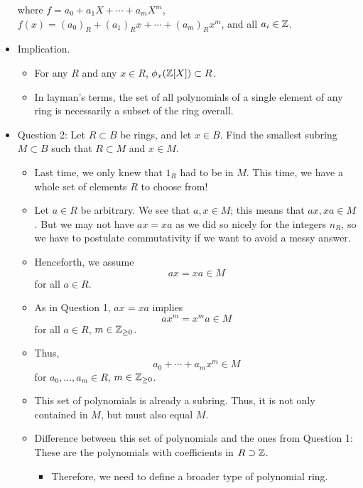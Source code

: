 \documentclass[../notes.tex]{subfiles}
\begin{document}
\begin{itemize}
    where $f=a_0+a_1X+\cdots+a_mX^m$, $f(x)=(a_0)_R+(a_1)_Rx+\cdots+(a_m)_Rx^m$, and all $a_i\in\mathbb{Z}$.
    \item Implication.
    \begin{itemize}
        \item For any $R$ and any $x\in R$, $\phi_x(\mathbb{Z}[X])\subset R$.
        \item In layman's terms, the set of all polynomials of a single element of any ring is necessarily a subset of the ring overall.
    \end{itemize}
    \item Question 2: Let $R\subset B$ be rings, and let $x\in B$. Find the smallest subring $M\subset B$ such that $R\subset M$ and $x\in M$.
    \begin{itemize}
        \item Last time, we only knew that $1_R$ had to be in $M$. This time, we have a whole set of elements $R$ to choose from!
        \item Let $a\in R$ be arbitrary. We see that $a,x\in M$; this means that $ax,xa\in M$. But we may not have $ax=xa$ as we did so nicely for the integers $n_R$, so we have to postulate commutativity if we want to avoid a messy answer.
        \item Henceforth, we assume
        \begin{equation*}
            ax=xa \in M
        \end{equation*}
        for all $a\in R$.
        \item As in Question 1, $ax=xa$ implies
        \begin{equation*}
            ax^m=x^ma \in M
        \end{equation*}
        for all $a\in R$, $m\in{\mathbb{Z}_{\geq 0}}$.
        \item Thus,
        \begin{equation*}
            a_0+\cdots+a_mx^m \in M
        \end{equation*}
        for $a_0,\dots,a_m\in R$, $m\in{\mathbb{Z}_{\geq 0}}$.
        \item This set of polynomials is already a subring. Thus, it is not only contained in $M$, but must also equal $M$.
        \item Difference between this set of polynomials and the ones from Question 1: These are the polynomials with coefficients in $R\supset\mathbb{Z}$.
        \begin{itemize}
            \item Therefore, we need to define a broader type of polynomial ring.

\end{itemize}
\end{itemize}
\end{itemize}
\end{document}
